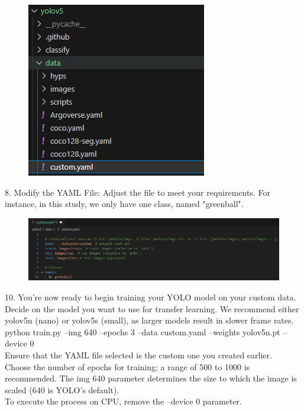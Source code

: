 \begin{figure}[H]
    \centering
    \includegraphics[scale=0.5]{evenbilder/tutorial/tutorial-7.png}
    \label{fig:tutorial-7}
\end{figure}

8.	Modify the YAML File: Adjust the file to meet your requirements. For instance, in this study, we only have one class, named "greenball".\\

\begin{figure}[H]
    \centering
    \includegraphics[scale=0.5]{evenbilder/tutorial/tutorial-8.png}
    \label{fig:tutorial-8}
\end{figure}

10.	You're now ready to begin training your YOLO model on your custom data. Decide on the model you want to use for transfer learning. We recommend either yolov5n (nano) or yolov5s (small), as larger models result in slower frame rates.\\

python train.py --img 640 --epochs 3 --data custom.yaml --weights yolov5n.pt --device 0\\

Ensure that the YAML file selected is the custom one you created earlier. \\

Choose the number of epochs for training; a range of 500 to 1000 is recommended. 
The img 640 parameter determines the size to which the image is scaled (640 is YOLO's default).\\ 
To execute the process on CPU, remove the --device 0 parameter.\\

